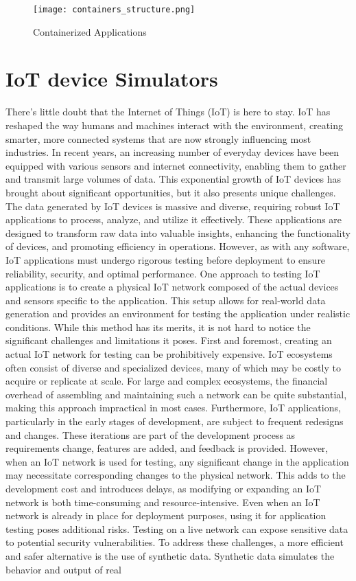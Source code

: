 \begin{figure}[!h]
    \graphicspath{ {./diagrams/} }
    \texttt{[image: containers\_structure.png]}
    \centering
    \caption{Containerized Applications}
    \label{fig:containerized_apps}
\end{figure}

\section{IoT device Simulators}

There's little doubt that the Internet of Things (IoT) is here to stay. IoT has reshaped the way humans and machines interact with the environment, creating smarter, more connected systems that are now strongly influencing most industries. In recent years, an increasing number of everyday devices have been equipped with various sensors and internet connectivity, enabling them to gather and transmit large volumes of data. This exponential growth of IoT devices has brought about significant opportunities, but it also presents unique challenges. The data generated by IoT devices is massive and diverse, requiring robust IoT applications to process, analyze, and utilize it effectively. These applications are designed to transform raw data into valuable insights, enhancing the functionality of devices, and promoting efficiency in operations. However, as with any software, IoT applications must undergo rigorous testing before deployment to ensure reliability, security, and optimal performance. One approach to testing IoT applications is to create a physical IoT network composed of the actual devices and sensors specific to the application. This setup allows for real-world data generation and provides an environment for testing the application under realistic conditions. While this method has its merits, it is not hard to notice the significant challenges and limitations it poses. First and foremost, creating an actual IoT network for testing can be prohibitively expensive. IoT ecosystems often consist of diverse and specialized devices, many of which may be costly to acquire or replicate at scale. For large and complex ecosystems, the financial overhead of assembling and maintaining such a network can be quite substantial, making this approach impractical in most cases. Furthermore, IoT applications, particularly in the early stages of development, are subject to frequent redesigns and changes. These iterations are part of the development process as requirements change, features are added, and feedback is provided. However, when an IoT network is used for testing, any significant change in the application may necessitate corresponding changes to the physical network. This adds to the development cost and introduces delays, as modifying or expanding an IoT network is both time-consuming and resource-intensive. Even when an IoT network is already in place for deployment purposes, using it for application testing poses additional risks. Testing on a live network can expose sensitive data to potential security vulnerabilities. To address these challenges, a more efficient and safer alternative is the use of synthetic data. Synthetic data simulates the behavior and output of real 